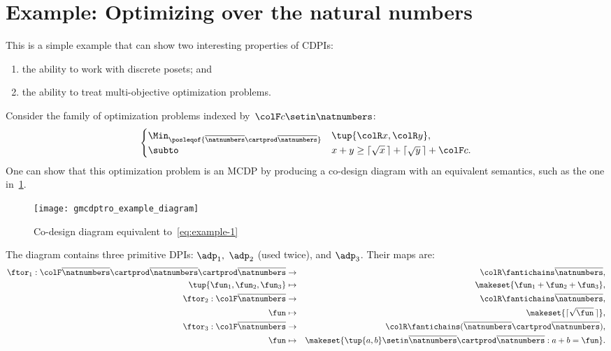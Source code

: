 \section{Example: Optimizing over the natural numbers}

This is a simple example that can show two interesting properties of CDPIs:
\begin{enumerate}
    \item the ability to work with discrete posets; and
    \item the ability to treat multi-objective optimization problems.
\end{enumerate}
Consider the family of optimization problems indexed by~${\colF c}\setin\natnumbers$:
%
\begin{equation}
    \begin{cases}
        \Min_{\posleqof{\overline{\natnumbers}\cartprod\overline{\natnumbers}}} & \tup{ {\colR x},{\colR y}} ,                                    \\
        \subto                                                                  & x+y\geq\lceil\sqrt{x}\,\rceil+\lceil\sqrt{y}\,\rceil+{\colF c}.
    \end{cases}\label{eq:example-1}
\end{equation}
%
One can show that this optimization problem is an MCDP by producing a co-design diagram with an equivalent semantics, such as the one in~\cref{fig:toydiagram}.

\begin{figure}[h]
    \centering
    \texttt{[image: gmcdptro\_example\_diagram]}
    \caption{Co-design diagram equivalent to~\cref{eq:example-1}}
    \label{fig:toydiagram}
\end{figure}

The diagram contains three primitive DPIs: $\adp_{1},$ $\adp_{2}$ (used twice), and $\adp_{3}$.
Their \ftor maps are:
\begin{eqnarray*}
    \ftor_{1}:{\colF\overline{\natnumbers}\cartprod\overline{\natnumbers}\cartprod\overline{\natnumbers}} & \rightarrow & {\colR\fantichains\overline{\natnumbers}},\\
    \tup{ \fun_{1},\fun_{2},\fun_{3}}  & \mapsto & \makeset{\fun_{1}+\fun_{2}+\fun_{3}},\\
    \ftor_{2}:{\colF\overline{\natnumbers}} & \rightarrow & {\colR\fantichains\overline{\natnumbers}},\\
    \fun& \mapsto & \makeset{\lceil\sqrt{\fun}\,\rceil},\\
    \ftor_{3}:{\colF\overline{\natnumbers}} & \rightarrow & {\colR\fantichains(\overline{\natnumbers}\cartprod\overline{\natnumbers})},\\
    \fun& \mapsto & \makeset{\tup{ a,b} \setin\overline{\natnumbers}\cartprod\overline{\natnumbers}:a+b=\fun}.
\end{eqnarray*}

